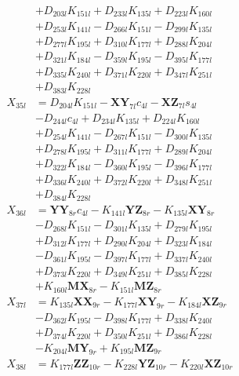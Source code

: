 \begin{multicols}{2}
\begin{align}
&+ D_{203l}K_{151l} + D_{233l}K_{135l} + D_{223l}K_{160l}  \nonumber \\
&+ D_{253l}K_{141l} - D_{266l}K_{151l} - D_{299l}K_{135l}  \nonumber \\
&+ D_{277l}K_{195l} + D_{310l}K_{177l} + D_{288l}K_{204l}  \nonumber \\
&+ D_{321l}K_{184l} - D_{359l}K_{195l} - D_{395l}K_{177l}  \nonumber \\
&+ D_{335l}K_{240l} + D_{371l}K_{220l} + D_{347l}K_{251l}  \nonumber \\
&+ D_{383l}K_{228l} \nonumber \\
X_{35l} &= D_{204l}K_{151l} - \mathbf{XY}_{7l}c_{4l} - \mathbf{XZ}_{7l}s_{4l}  \nonumber \\
&- D_{244l}c_{4l} + D_{234l}K_{135l} + D_{224l}K_{160l}  \nonumber \\
&+ D_{254l}K_{141l} - D_{267l}K_{151l} - D_{300l}K_{135l}  \nonumber \\
&+ D_{278l}K_{195l} + D_{311l}K_{177l} + D_{289l}K_{204l}  \nonumber \\
&+ D_{322l}K_{184l} - D_{360l}K_{195l} - D_{396l}K_{177l}  \nonumber \\
&+ D_{336l}K_{240l} + D_{372l}K_{220l} + D_{348l}K_{251l}  \nonumber \\
&+ D_{384l}K_{228l} \nonumber \\
X_{36l} &= \mathbf{YY}_{8r}c_{4l} - K_{141l}\mathbf{YZ}_{8r} - K_{135l}\mathbf{XY}_{8r}  \nonumber \\
&- D_{268l}K_{151l} - D_{301l}K_{135l} + D_{279l}K_{195l}  \nonumber \\
&+ D_{312l}K_{177l} + D_{290l}K_{204l} + D_{323l}K_{184l}  \nonumber \\
&- D_{361l}K_{195l} - D_{397l}K_{177l} + D_{337l}K_{240l}  \nonumber \\
&+ D_{373l}K_{220l} + D_{349l}K_{251l} + D_{385l}K_{228l}  \nonumber \\
&+ K_{160l}\mathbf{MX}_{8r} - K_{151l}\mathbf{MZ}_{8r} \nonumber \\
X_{37l} &= K_{135l}\mathbf{XX}_{9r} - K_{177l}\mathbf{XY}_{9r} - K_{184l}\mathbf{XZ}_{9r}  \nonumber \\
&- D_{362l}K_{195l} - D_{398l}K_{177l} + D_{338l}K_{240l}  \nonumber \\
&+ D_{374l}K_{220l} + D_{350l}K_{251l} + D_{386l}K_{228l}  \nonumber \\
&- K_{204l}\mathbf{MY}_{9r} + K_{195l}\mathbf{MZ}_{9r} \nonumber \\
X_{38l} &= K_{177l}\mathbf{ZZ}_{10r} - K_{228l}\mathbf{YZ}_{10r} - K_{220l}\mathbf{XZ}_{10r}  \nonumber \\

\end{align}
\end{multicols}
